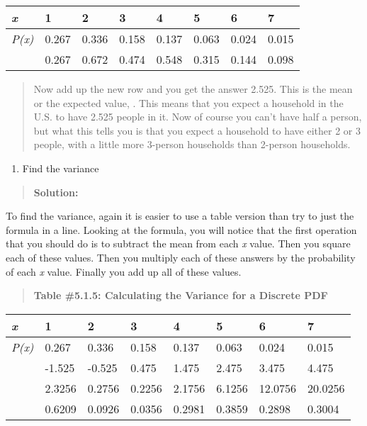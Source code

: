 \documentclass[]{book}
\providecommand{\tightlist}{%
  \setlength{\itemsep}{0pt}\setlength{\parskip}{0pt}}
\begin{document}
\begin{longtable}[]{@{}llllllll@{}}
\toprule
\emph{x} & 1 & 2 & 3 & 4 & 5 & 6 & 7\tabularnewline
\midrule
\endhead
\emph{P(x) } & 0.267 & 0.336 & 0.158 & 0.137 & 0.063 & 0.024 & 0.015\tabularnewline
& 0.267 & 0.672 & 0.474 & 0.548 & 0.315 & 0.144 & 0.098\tabularnewline
\bottomrule
\end{longtable}

\begin{quote}
Now add up the new row and you get the answer 2.525. This is the mean
or the expected value, . This means that you expect a household in the
U.S. to have 2.525 people in it. Now of course you can't have half a
person, but what this tells you is that you expect a household to have
either 2 or 3 people, with a little more 3-person households than
2-person households.
\end{quote}

\begin{enumerate}
\def\labelenumi{\alph{enumi}.}
\setcounter{enumi}{1}
\tightlist
\item
  Find the variance
\end{enumerate}

\begin{quote}
\textbf{Solution:}
\end{quote}

To find the variance, again it is easier to use a table version than try
to just the formula in a line. Looking at the formula, you will notice
that the first operation that you should do is to subtract the mean from
each \emph{x} value. Then you square each of these values. Then you multiply
each of these answers by the probability of each \emph{x} value. Finally you
add up all of these values.

\begin{quote}
\textbf{Table \#5.1.5: Calculating the Variance for a Discrete PDF}
\end{quote}

\begin{longtable}[]{@{}llllllll@{}}
\toprule
\emph{x} & 1 & 2 & 3 & 4 & 5 & 6 & 7\tabularnewline
\midrule
\endhead
\emph{P(x) } & 0.267 & 0.336 & 0.158 & 0.137 & 0.063 & 0.024 & 0.015\tabularnewline
& -1.525 & -0.525 & 0.475 & 1.475 & 2.475 & 3.475 & 4.475\tabularnewline
& 2.3256 & 0.2756 & 0.2256 & 2.1756 & 6.1256 & 12.0756 & 20.0256\tabularnewline
& 0.6209 & 0.0926 & 0.0356 & 0.2981 & 0.3859 & 0.2898 & 0.3004\tabularnewline
\bottomrule
\end{longtable}
\end{document}
